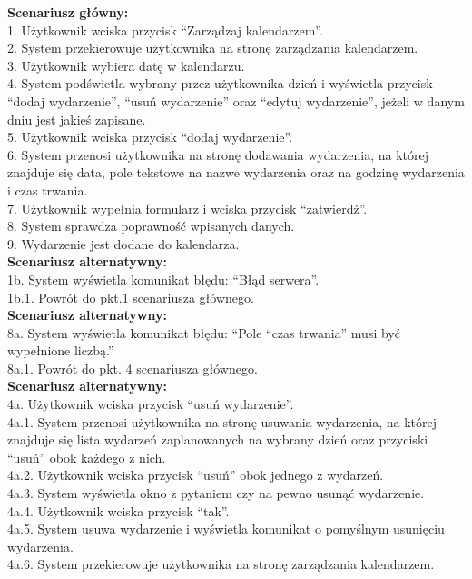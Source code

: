 \textbf{Scenariusz główny:}\\
1. Użytkownik wciska przycisk “Zarządzaj kalendarzem”.\\
2. System przekierowuje użytkownika na stronę zarządzania kalendarzem.\\
3. Użytkownik wybiera datę w kalendarzu.\\
4. System podświetla wybrany przez użytkownika dzień i wyświetla przycisk “dodaj
wydarzenie”, “usuń wydarzenie” oraz “edytuj wydarzenie”, jeżeli w danym dniu jest
jakieś zapisane.\\
5. Użytkownik wciska przycisk “dodaj wydarzenie”.\\
6. System przenosi użytkownika na stronę dodawania wydarzenia, na której znajduje się
data, pole tekstowe na nazwe wydarzenia oraz na godzinę wydarzenia i czas trwania.\\
7. Użytkownik wypełnia formularz i wciska przycisk “zatwierdź”.\\
8. System sprawdza poprawność wpisanych danych.\\
9. Wydarzenie jest dodane do kalendarza.\\
\textbf{Scenariusz alternatywny:}\\
1b. System wyświetla komunikat błędu: “Błąd serwera”.\\
1b.1. Powrót do pkt.1 scenariusza głównego.\\
\textbf{Scenariusz alternatywny:}\\
8a. System wyświetla komunikat błędu: “Pole “czas trwania” musi być wypełnione liczbą.”\\
8a.1. Powrót do pkt. 4 scenariusza głównego.\\
\textbf{Scenariusz alternatywny:}\\
4a. Użytkownik wciska przycisk “usuń wydarzenie”.\\
4a.1. System przenosi użytkownika na stronę usuwania wydarzenia, na której znajduje się
lista wydarzeń zaplanowanych na wybrany dzień oraz przyciski “usuń” obok każdego z nich.\\
4a.2. Użytkownik wciska przycisk “usuń” obok jednego z wydarzeń.\\
4a.3. System wyświetla okno z pytaniem czy na pewno usunąć wydarzenie.\\
4a.4. Użytkownik wciska przycisk “tak”.\\
4a.5. System usuwa wydarzenie i wyświetla komunikat o pomyślnym usunięciu wydarzenia.\\
4a.6. System przekierowuje użytkownika na stronę zarządzania kalendarzem.\\
